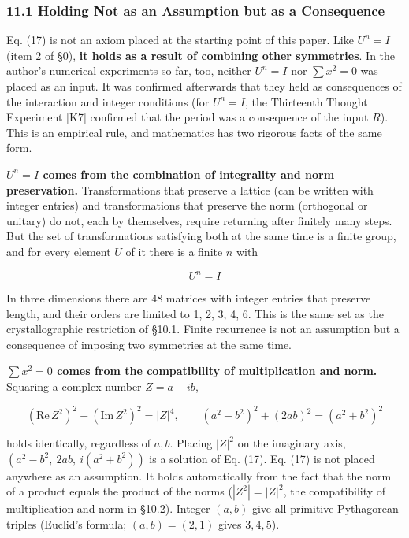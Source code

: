 \documentclass[
  a4paper,
]{article}
\begin{document}
\subsubsection{11.1 Holding Not as an Assumption but as a
Consequence}\label{holding-not-as-an-assumption-but-as-a-consequence}

Eq. (17) is not an axiom placed at the starting point of this paper.
Like \(U^n=I\) (item 2 of §0), \textbf{it holds as a result of combining
other symmetries}. In the author's numerical experiments so far, too,
neither \(U^n=I\) nor \(\sum x^2=0\) was placed as an input. It was
confirmed afterwards that they held as consequences of the interaction
and integer conditions (for \(U^n=I\), the Thirteenth Thought Experiment
{[}K7{]} confirmed that the period was a consequence of the input
\(R\)). This is an empirical rule, and mathematics has two rigorous
facts of the same form.

\textbf{\(U^n=I\) comes from the combination of integrality and norm
preservation.} Transformations that preserve a lattice (can be written
with integer entries) and transformations that preserve the norm
(orthogonal or unitary) do not, each by themselves, require returning
after finitely many steps. But the set of transformations satisfying
both at the same time is a finite group, and for every element \(U\) of
it there is a finite \(n\) with

\[
U^n=I
\tag{17a}
\]

In three dimensions there are 48 matrices with integer entries that
preserve length, and their orders are limited to 1, 2, 3, 4, 6. This is
the same set as the crystallographic restriction of §10.1. Finite
recurrence is not an assumption but a consequence of imposing two
symmetries at the same time.

\textbf{\(\sum x^2=0\) comes from the compatibility of multiplication
and norm.} Squaring a complex number \(Z=a+ib\),

\[
(\mathrm{Re}\,Z^2)^2+(\mathrm{Im}\,Z^2)^2=|Z|^4,
\qquad
(a^2-b^2)^2+(2ab)^2=(a^2+b^2)^2
\tag{17b}
\]

holds identically, regardless of \(a,b\). Placing \(|Z|^2\) on the
imaginary axis, \((a^2-b^2,\ 2ab,\ i(a^2+b^2))\) is a solution of Eq.
(17). Eq. (17) is not placed anywhere as an assumption. It holds
automatically from the fact that the norm of a product equals the
product of the norms (\(|Z^2|=|Z|^2\), the compatibility of
multiplication and norm in §10.2). Integer \((a,b)\) give all primitive
Pythagorean triples (Euclid's formula; \((a,b)=(2,1)\) gives \(3,4,5\)).
\end{document}
